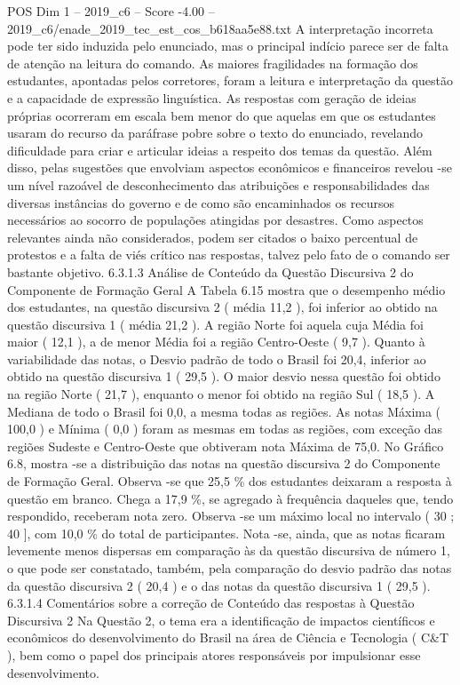 \begin{textsample}{POS Dim 1 – 2019\_c6 – Score -4.00 – 2019\_c6/enade\_2019\_tec\_est\_cos\_b618aa5e88.txt}
A interpretação incorreta pode ter sido induzida pelo enunciado, mas o principal indício parece ser de falta de atenção na leitura do comando.
As maiores fragilidades na formação dos estudantes, apontadas pelos corretores, foram a leitura e interpretação da questão e a capacidade de expressão linguística.
As respostas com geração de ideias próprias ocorreram em escala bem menor do que aquelas em que os estudantes usaram do recurso da paráfrase pobre sobre o texto do enunciado, revelando dificuldade para criar e articular ideias a respeito dos temas da questão.
Além disso, pelas sugestões que envolviam aspectos econômicos e financeiros revelou -se um nível razoável de desconhecimento das atribuições e responsabilidades das diversas instâncias do governo e de como são encaminhados os recursos necessários ao socorro de populações atingidas por desastres.
Como aspectos relevantes ainda não considerados, podem ser citados o baixo percentual de protestos e a falta de viés crítico nas respostas, talvez pelo fato de o comando ser bastante objetivo. 6.3.1.3 Análise de Conteúdo da Questão Discursiva 2 do Componente de Formação Geral A Tabela 6.15 mostra que o desempenho médio dos estudantes, na questão discursiva 2 ( média 11,2 ), foi inferior ao obtido na questão discursiva 1 ( média 21,2 ).
A região Norte foi aquela cuja Média foi maior ( 12,1 ), a de menor Média foi a região Centro-Oeste ( 9,7 ).
Quanto à variabilidade das notas, o Desvio padrão de todo o Brasil foi 20,4, inferior ao obtido na questão discursiva 1 ( 29,5 ).
O maior desvio nessa questão foi obtido na região Norte ( 21,7 ), enquanto o menor foi obtido na região Sul ( 18,5 ).
A Mediana de todo o Brasil foi 0,0, a mesma todas as regiões.
As notas Máxima ( 100,0 ) e Mínima ( 0,0 ) foram as mesmas em todas as regiões, com exceção das regiões Sudeste e Centro-Oeste que obtiveram nota Máxima de 75,0.
No Gráfico 6.8, mostra -se a distribuição das notas na questão discursiva 2 do Componente de Formação Geral.
Observa -se que 25,5 \% dos estudantes deixaram a resposta à questão em branco.
Chega a 17,9 \%, se agregado à frequência daqueles que, tendo respondido, receberam nota zero.
Observa -se um máximo local no intervalo ( 30 ; 40 ], com 10,0 \% do total de participantes.
Nota -se, ainda, que as notas ficaram levemente menos dispersas em comparação às da questão discursiva de número 1, o que pode ser constatado, também, pela comparação do desvio padrão das notas da questão discursiva 2 ( 20,4 ) e o das notas da questão discursiva 1 ( 29,5 ). 6.3.1.4 Comentários sobre a correção de Conteúdo das respostas à Questão Discursiva 2 Na Questão 2, o tema era a identificação de impactos científicos e econômicos do desenvolvimento do Brasil na área de Ciência e Tecnologia ( C\&T ), bem como o papel dos principais atores responsáveis por impulsionar esse desenvolvimento.

\end{textsample}
